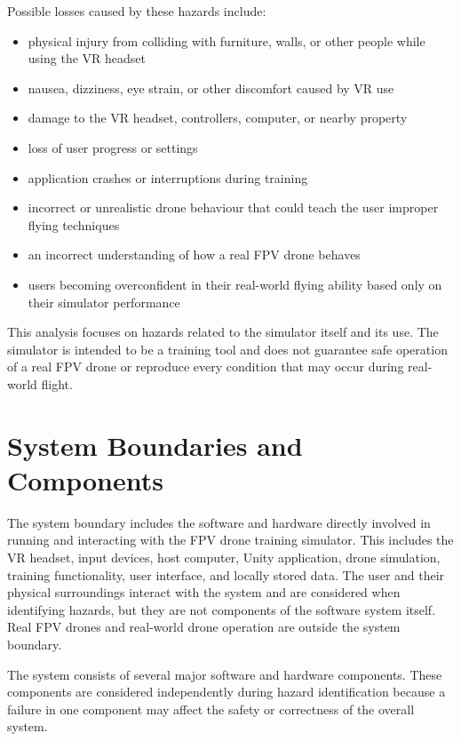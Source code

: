 \documentclass{article}
\begin{document}
Possible losses caused by these hazards include:

\begin{itemize}
    \item physical injury from colliding with furniture, walls, or other people
    while using the VR headset
    \item nausea, dizziness, eye strain, or other discomfort caused by VR use
    \item damage to the VR headset, controllers, computer, or nearby property
    \item loss of user progress or settings
    \item application crashes or interruptions during training
    \item incorrect or unrealistic drone behaviour that could teach the user
    improper flying techniques
    \item an incorrect understanding of how a real FPV drone behaves
    \item users becoming overconfident in their real-world flying ability based
    only on their simulator performance
\end{itemize}

This analysis focuses on hazards related to the simulator itself and its use.
The simulator is intended to be a training tool and does not guarantee safe
operation of a real FPV drone or reproduce every condition that may occur
during real-world flight.

\section{System Boundaries and Components}\label{sec:boundaries}

The system boundary includes the software and hardware directly involved in
running and interacting with the FPV drone training simulator. This includes
the VR headset, input devices, host computer, Unity application, drone
simulation, training functionality, user interface, and locally stored data.
The user and their physical surroundings interact with the system and are
considered when identifying hazards, but they are not components of the
software system itself. Real FPV drones and real-world drone operation are
outside the system boundary.

The system consists of several major software and hardware components. These
components are considered independently during hazard identification because a
failure in one component may affect the safety or correctness of the overall
system.
\end{document}
